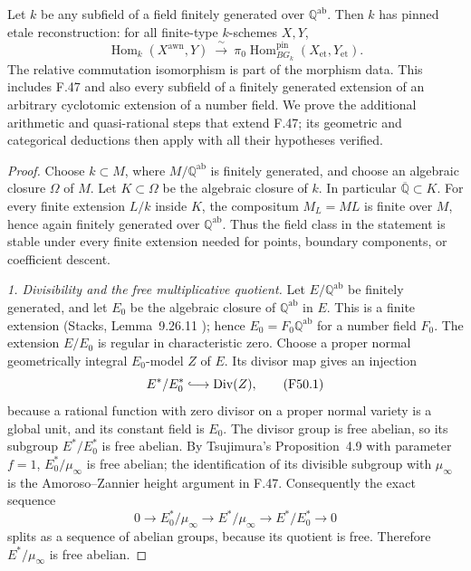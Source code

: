 Let $k$ be any subfield of a field finitely generated over
$\mathbb Q^{\mathrm{ab}}$. Then $k$ has pinned etale reconstruction:
for all finite-type $k$-schemes $X,Y$,
\[
 \operatorname{Hom}_k(X^{\mathrm{awn}},Y)
  \ \xrightarrow{\ \sim\ }\
 \pi_0\operatorname{Hom}^{\mathrm{pin}}_{B G_k}
             (X_{\mathrm{et}},Y_{\mathrm{et}}).
 \tag{F50}
\]
The relative commutation isomorphism is part of the morphism data.
This includes F.47 and also every subfield of a finitely generated
extension of an arbitrary cyclotomic extension of a number field.
We prove the additional arithmetic and quasi-rational steps that
extend F.47; its geometric and categorical deductions then apply
with all their hypotheses verified.

\begin{proof}
Choose $k\subset M$, where $M/\mathbb Q^{\mathrm{ab}}$ is finitely
generated, and choose an algebraic closure $\Omega$ of $M$. Let
$K\subset\Omega$ be the algebraic closure of $k$. In particular
$\overline{\mathbb Q}\subset K$. For every finite extension
$L/k$ inside $K$, the compositum $M_L=ML$ is finite over $M$,
hence again finitely generated over $\mathbb Q^{\mathrm{ab}}$.
Thus the field class in the statement is stable under every finite
extension needed for points, boundary components, or coefficient
descent.

\emph{1. Divisibility and the free multiplicative quotient.}
Let $E/\mathbb Q^{\mathrm{ab}}$ be finitely generated, and let
$E_0$ be the algebraic closure of $\mathbb Q^{\mathrm{ab}}$ in $E$.
This is a finite extension (Stacks, Lemma~9.26.11
\citep{StacksFGConstants}); hence $E_0=F_0\mathbb Q^{\mathrm{ab}}$
for a number field $F_0$. The extension $E/E_0$ is regular in
characteristic zero. Choose a proper normal geometrically integral
$E_0$-model $Z$ of $E$. Its divisor map gives an injection
\[
 E^*/E_0^*\lhook\joinrel\longrightarrow
       \operatorname{Div}(Z),                              \tag{F50.1}
\]
because a rational function with zero divisor on a proper normal
variety is a global unit, and its constant field is $E_0$.
The divisor group is free abelian, so its subgroup $E^*/E_0^*$ is
free abelian. By Tsujimura's Proposition~4.9 with parameter $f=1$,
$E_0^*/\mu_\infty$ is free abelian; the identification of its
divisible subgroup with $\mu_\infty$ is the Amoroso--Zannier
height argument in F.47. Consequently the exact sequence
\[
 0\longrightarrow E_0^*/\mu_\infty
 \longrightarrow E^*/\mu_\infty
 \longrightarrow E^*/E_0^*\longrightarrow0
\]
splits as a sequence of abelian groups, because its quotient is
free. Therefore $E^*/\mu_\infty$ is free abelian.


\end{proof}
